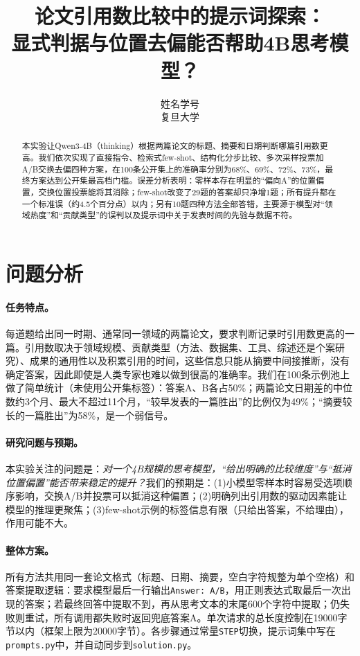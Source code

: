 \documentclass{article}
\title{论文引用数比较中的提示词探索：\\显式判据与位置去偏能否帮助4B思考模型？}
\author{姓名\quad 学号\\复旦大学}
\begin{document}
\maketitle
\begin{abstract}
本实验让Qwen3-4B（thinking）根据两篇论文的标题、摘要和日期判断哪篇引用数更高。我们依次实现了直接指令、检索式few-shot、结构化分步比较、多次采样投票加A/B交换去偏四种方案，在100条公开集上的准确率分别为68\%、69\%、72\%、73\%，最终方案达到公开集最高档门槛。误差分析表明：零样本存在明显的“偏向A”的位置偏置，交换位置投票能将其消除；few-shot改变了29题的答案却只净增1题；所有提升都在一个标准误（约4.5个百分点）以内；另有10题四种方法全部答错，主要源于模型对“领域热度”和“贡献类型”的误判以及提示词中关于发表时间的先验与数据不符。
\end{abstract}

\section{问题分析}
\paragraph{任务特点。}每道题给出同一时期、通常同一领域的两篇论文，要求判断记录时引用数更高的一篇。引用数取决于领域规模、贡献类型（方法、数据集、工具、综述还是个案研究）、成果的通用性以及积累引用的时间，这些信息只能从摘要中间接推断，没有确定答案，因此即使是人类专家也难以做到很高的准确率。我们在100条示例池上做了简单统计（未使用公开集标签）：答案A、B各占50\%；两篇论文日期差的中位数约3个月、最大不超过11个月，“较早发表的一篇胜出”的比例仅为49\%；“摘要较长的一篇胜出”为58\%，是一个弱信号。

\paragraph{研究问题与预期。}本实验关注的问题是：\emph{对一个4B规模的思考模型，“给出明确的比较维度”与“抵消位置偏置”能否带来稳定的提升？}我们的预期是：(1)小模型零样本时容易受选项顺序影响，交换A/B并投票可以抵消这种偏置；(2)明确列出引用数的驱动因素能让模型的推理更聚焦；(3)few-shot示例的标签信息有限（只给出答案，不给理由），作用可能不大。

\paragraph{整体方案。}所有方法共用同一套论文格式（标题、日期、摘要，空白字符规整为单个空格）和答案提取逻辑：要求模型最后一行输出\texttt{Answer: A/B}，用正则表达式取最后一次出现的答案；若最终回答中提取不到，再从思考文本的末尾600个字符中提取；仍失败则重试，所有调用都失败时返回兜底答案A。单次请求的总长度控制在19000字节以内（框架上限为20000字节）。各步骤通过常量\texttt{STEP}切换，提示词集中写在\texttt{prompts.py}中，并自动同步到\texttt{solution.py}。
\end{document}
